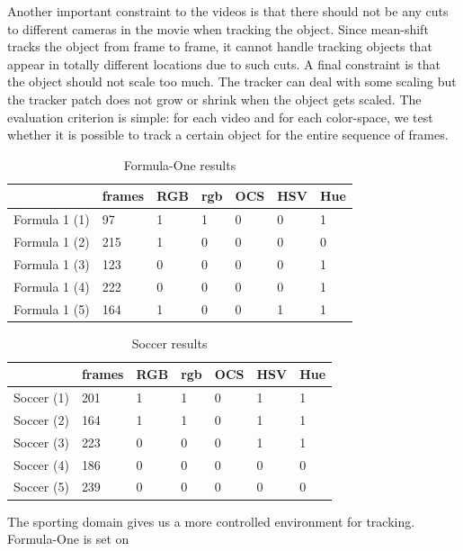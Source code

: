\documentclass[a4paper,11pt]{article}
\begin{document}
		Another important constraint to the videos is that there should not be any cuts to different
		cameras in the movie when tracking the object. Since mean-shift tracks the object from frame
		to frame, it cannot handle tracking objects that appear in totally different locations due
		to such cuts. A final constraint is that the object should not scale too much. The tracker
		can deal with some scaling but the tracker patch does not grow or shrink when the object gets
		scaled. The evaluation criterion is simple: for each video and for each color-space, we test
		whether it is possible to track a certain object for the entire sequence of frames.
		\begin{table}[H]
			\centering
			\begin{tabular}{| l | l | l | l | l | l | l |}
			\hline
			              & frames & RGB & rgb & OCS & HSV & Hue \\
			\hline
			Formula 1 (1) &  97    & 1   & 1   & 0   & 0   & 1 \\
			Formula 1 (2) & 215    & 1   & 0   & 0   & 0   & 0 \\
			Formula 1 (3) & 123    & 0   & 0   & 0   & 0   & 1 \\
			Formula 1 (4) & 222    & 0   & 0   & 0   & 0   & 1 \\
			Formula 1 (5) & 164    & 1   & 0   & 0   & 1   & 1 \\
			\hline
			\end{tabular}
			\caption{Formula-One results}
			\label{table:f1}
		\end{table}
		\begin{table}[H]
			\centering
			\begin{tabular}{| l | l | l | l | l | l | l |}
			\hline
			          & frames & RGB & rgb & OCS & HSV & Hue \\
			\hline
			Soccer (1)& 201    & 1   & 1   & 0   & 1   & 1 \\
			Soccer (2)& 164    & 1   & 1   & 0   & 1   & 1 \\
			Soccer (3)& 223    & 0   & 0   & 0   & 1   & 1 \\
			Soccer (4)& 186    & 0   & 0   & 0   & 0   & 0 \\
			Soccer (5)& 239    & 0   & 0   & 0   & 0   & 0 \\
			\hline
			\end{tabular}
			\caption{Soccer results}
			\label{table:soc}
		\end{table}
		\noindent
		The sporting domain gives us a more controlled environment for tracking. Formula-One is set on
\end{document}
